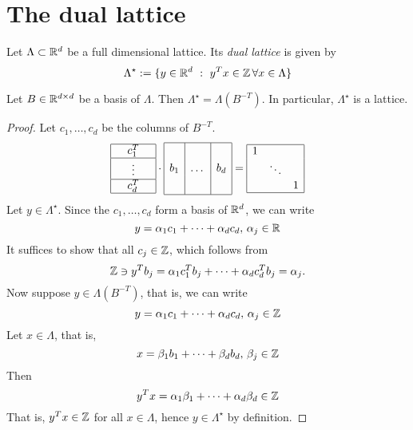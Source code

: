 \section{The dual lattice}

\begin{definition}
  Let $\Lambda \subset \mathbb{R}^d$ be a full dimensional lattice.
  Its \emph{dual lattice} is given by
  \[
    \Lambda^\star := \{ y \in \mathbb{R}^d ~:~ y^Tx \in \mathbb{Z} \, \forall x \in \Lambda \}
  \]
\end{definition}

\begin{lemma}
  \label{lemma:dual-basis}
  Let $B \in \mathbb{R}^{d \times d}$ be a basis of $\Lambda$.
  Then $\Lambda^\star = \Lambda(B^{-T})$.
  In particular, $\Lambda^\star$ is a lattice.
\end{lemma}
\begin{proof}
  Let $c_1, \ldots, c_d$ be the columns of $B^{-T}$.
  \[
    \begin{array}{|c|}
      \hline \quad c_1^T \quad  \\\hline
      \vdots \\\hline
      c_d^T \\\hline
    \end{array}
    \cdot
    \begin{array}{|c|c|c|}
      \hline  & &\\[0.5em]
      b_1 & \dots & b_d \\
      & & \\[0.5em]\hline
    \end{array}
    =
    \begin{array}{|lcr|}
      \hline 1 & & \\
       & \ddots & \\
      & & 1 \\\hline
    \end{array}
  \]
  Let $y \in \Lambda^\star$.
  Since the $c_1, \ldots, c_d$ form a basis of $\mathbb{R}^d$,
  we can write
  \[
    y = \alpha_1 c_1 + \dots + \alpha_d c_d,\, \alpha_j \in \mathbb{R}
  \]
  It suffices to show that all $c_j \in \mathbb{Z}$,
  which follows from
  \[
    \mathbb{Z} \ni y^T b_j = \alpha_1 c_1^T b_j + \dots + \alpha_d c_d^T b_j = \alpha_j.
  \]
  Now suppose $y \in \Lambda(B^{-T})$, that is,
  we can write
  \[
    y = \alpha_1 c_1 + \dots + \alpha_d c_d,\, \alpha_j \in \mathbb{Z}
  \]
  Let $x \in \Lambda$, that is,
  \[
    x = \beta_1 b_1 + \dots + \beta_d b_d,\, \beta_j \in \mathbb{Z}
  \]
  Then
  \[
    y^Tx = \alpha_1 \beta_1 + \dots + \alpha_d \beta_d \in \mathbb{Z}
  \]
  That is, $y^Tx \in \mathbb{Z}$ for all $x \in \Lambda$,
  hence $y \in \Lambda^\star$ by definition.
\end{proof}

